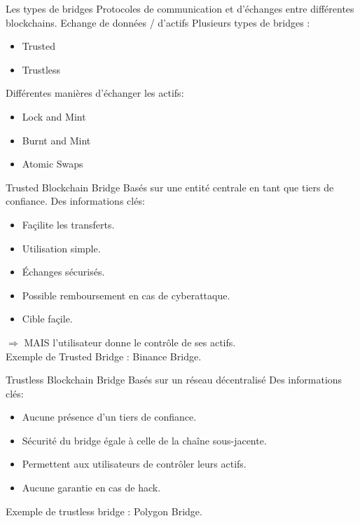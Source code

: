 \begin{frame}{Les types de bridges}
 Protocoles de communication et d'échanges entre différentes blockchains.
 Echange de données / d'actifs \newline \newline
 Plusieurs types de bridges :
 \begin{itemize}
     \item Trusted
     \item Trustless
 \end{itemize} 
 Différentes manières d'échanger les actifs:
 \begin{itemize}
     \item Lock and Mint
     \item Burnt and Mint
     \item Atomic Swaps
 \end{itemize}
\end{frame}

\begin{frame}{Trusted Blockchain Bridge}
    Basés sur une entité centrale en tant que tiers de confiance.
Des informations clés: 
    \begin{itemize}
        \item Façilite les transferts.
        \item Utilisation simple.
        \item Échanges sécurisés.
        \item Possible remboursement en cas de cyberattaque.
        \item Cible façile.
    \end{itemize}
    $\Rightarrow$ MAIS l'utilisateur donne le contrôle de ses actifs.\\ 
Exemple de Trusted Bridge : Binance Bridge.
\end{frame}

\begin{frame}{Trustless Blockchain Bridge}
Basés sur un réseau décentralisé 
Des informations clés: 
\begin{itemize}
    \item Aucune présence d'un tiers de confiance.
    \item Sécurité du bridge égale à celle de la chaîne sous-jacente.
    \item Permettent aux utilisateurs de contrôler leurs actifs.
    \item Aucune garantie en cas de hack.
\end{itemize}
Exemple de trustless bridge : Polygon Bridge.
\end{frame}

